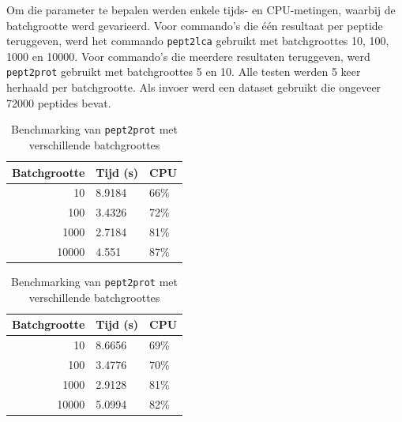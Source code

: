 Om die parameter te bepalen werden enkele tijds- en CPU-metingen, waarbij de 
batchgrootte werd gevarieerd. Voor commando's die één resultaat per peptide 
teruggeven, werd het commando \texttt{pept2lca} gebruikt met batchgroottes 10, 
100, 1000 en 10000. Voor commando's die meerdere resultaten teruggeven, werd 
\texttt{pept2prot} gebruikt met batchgroottes 5 en 10. Alle testen werden 5 
keer herhaald per batchgrootte. Als invoer werd een dataset gebruikt die 
ongeveer 72000 peptides bevat.

\begin{table}
    \caption{Benchmarking van \texttt{pept2lca} met verschillende 
    batchgroottes}
    \label{tbl:clibenchmark}
    \begin{subtable}{.45\linewidth}
        \centering
        \caption{Oude code}
        \begin{tabular}{rll}
            \toprule 
            Batchgrootte & Tijd (s) & CPU  \\
            \midrule
            10           & 8.9184   & 66\% \\
            100          & 3.4326   & 72\% \\
            1000         & 2.7184   & 81\% \\
            10000        & 4.551    & 87\% \\
            \bottomrule
        \end{tabular}
    \end{subtable}
    \begin{subtable}{.45\linewidth}
        \centering
        \caption{Nieuwe code}
        \begin{tabular}{rll}
            \toprule 
            Batchgrootte & Tijd (s) & CPU  \\
            \midrule
            10           & 8.6656   & 69\% \\
            100          & 3.4776   & 70\% \\
            1000         & 2.9128   & 81\% \\
            10000        & 5.0994   & 82\% \\
            \bottomrule
        \end{tabular}
    \end{subtable}
    \\
    \\
    \caption{Benchmarking van \texttt{pept2prot} met verschillende 
    batchgroottes}
    \begin{subtable}{.45\linewidth}
        \centering

\end{subtable}
\end{table}
